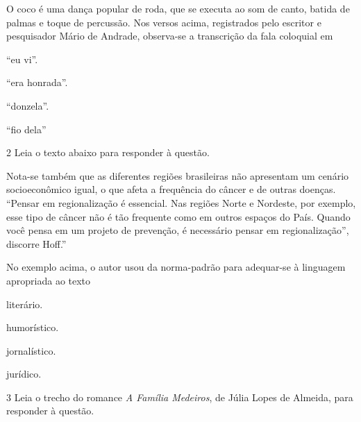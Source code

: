 O coco é uma dança popular de roda, que se executa ao som de canto, batida de palmas e 
toque de percussão. Nos versos acima, registrados pelo escritor e pesquisador Mário de 
Andrade, observa-se a transcrição da fala coloquial em

\begin{escolha}
  
  \item ``eu vi''.
  
  \item ``era honrada''.
  
  \item ``donzela''.
  
  \item ``fio dela''

\end{escolha}

\num{2} Leia o texto abaixo para responder à questão.

\begin{myquote}
Nota-se também que as diferentes regiões brasileiras não apresentam um
cenário socioeconômico igual, o que afeta a frequência do câncer e de
outras doenças. ``Pensar em regionalização é essencial. Nas regiões Norte
e Nordeste, por exemplo, esse tipo de câncer não é tão frequente como em
outros espaços do País. Quando você pensa em um projeto de prevenção, é
necessário pensar em regionalização'', discorre Hoff.''

\end{myquote}

No exemplo acima, o autor usou da norma-padrão para adequar-se à linguagem apropriada ao texto

\begin{escolha}
  
  \item literário.
  
  \item humorístico.
  
  \item jornalístico.
  
  \item jurídico.

\end{escolha}

\num{3} Leia o trecho do romance \textit{A Família Medeiros}, de Júlia Lopes de Almeida, para 
responder à questão. 

